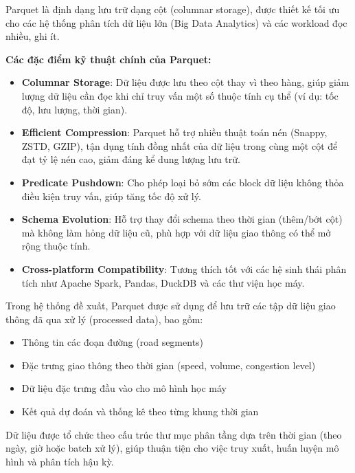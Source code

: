 Parquet là định dạng lưu trữ dạng cột (columnar storage), được thiết kế tối ưu cho các hệ thống phân tích dữ liệu lớn (Big Data Analytics) và các workload đọc nhiều, ghi ít.

\textbf{Các đặc điểm kỹ thuật chính của Parquet:}

\begin{itemize}
    \item \textbf{Columnar Storage}: Dữ liệu được lưu theo cột thay vì theo hàng, giúp giảm lượng dữ liệu cần đọc khi chỉ truy vấn một số thuộc tính cụ thể (ví dụ: tốc độ, lưu lượng, thời gian).
    
    \item \textbf{Efficient Compression}: Parquet hỗ trợ nhiều thuật toán nén (Snappy, ZSTD, GZIP), tận dụng tính đồng nhất của dữ liệu trong cùng một cột để đạt tỷ lệ nén cao, giảm đáng kể dung lượng lưu trữ.
    
    \item \textbf{Predicate Pushdown}: Cho phép loại bỏ sớm các block dữ liệu không thỏa điều kiện truy vấn, giúp tăng tốc độ xử lý.
    
    \item \textbf{Schema Evolution}: Hỗ trợ thay đổi schema theo thời gian (thêm/bớt cột) mà không làm hỏng dữ liệu cũ, phù hợp với dữ liệu giao thông có thể mở rộng thuộc tính.
    
    \item \textbf{Cross-platform Compatibility}: Tương thích tốt với các hệ sinh thái phân tích như Apache Spark, Pandas, DuckDB và các thư viện học máy.
\end{itemize}




Trong hệ thống đề xuất, Parquet được sử dụng để lưu trữ các tập dữ liệu giao thông đã qua xử lý (processed data), bao gồm:

\begin{itemize}
    \item Thông tin các đoạn đường (road segments)
    \item Đặc trưng giao thông theo thời gian (speed, volume, congestion level)
    \item Dữ liệu đặc trưng đầu vào cho mô hình học máy
    \item Kết quả dự đoán và thống kê theo từng khung thời gian
\end{itemize}

Dữ liệu được tổ chức theo cấu trúc thư mục phân tầng dựa trên thời gian (theo ngày, giờ hoặc batch xử lý), giúp thuận tiện cho việc truy xuất, huấn luyện mô hình và phân tích hậu kỳ.
